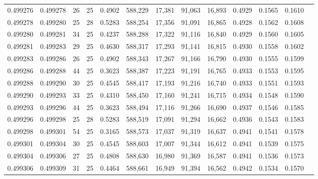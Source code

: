 \begin{tabular}{rrrrrrrrrrrrr}
0.499276 & 0.499278 &    26 &  25 &                                     0.4902 & 588,229 &  17,381 &  91,063 &  16,893 & 0.4929 & 0.1565 & 0.1610 \\
0.499278 & 0.499280 &    25 &  28 &                                     0.5283 & 588,254 &  17,356 &  91,091 &  16,865 & 0.4928 & 0.1562 & 0.1608 \\
0.499280 & 0.499281 &    34 &  25 &                                     0.4237 & 588,288 &  17,322 &  91,116 &  16,840 & 0.4929 & 0.1560 & 0.1605 \\
0.499281 & 0.499283 &    29 &  25 &                                     0.4630 & 588,317 &  17,293 &  91,141 &  16,815 & 0.4930 & 0.1558 & 0.1602 \\
0.499283 & 0.499286 &    26 &  25 &                                     0.4902 & 588,343 &  17,267 &  91,166 &  16,790 & 0.4930 & 0.1555 & 0.1599 \\
0.499286 & 0.499288 &    44 &  25 &                                     0.3623 & 588,387 &  17,223 &  91,191 &  16,765 & 0.4933 & 0.1553 & 0.1595 \\
0.499288 & 0.499290 &    30 &  25 &                                     0.4545 & 588,417 &  17,193 &  91,216 &  16,740 & 0.4933 & 0.1551 & 0.1593 \\
0.499290 & 0.499293 &    33 &  25 &                                     0.4310 & 588,450 &  17,160 &  91,241 &  16,715 & 0.4934 & 0.1548 & 0.1590 \\
0.499293 & 0.499296 &    44 &  25 &                                     0.3623 & 588,494 &  17,116 &  91,266 &  16,690 & 0.4937 & 0.1546 & 0.1585 \\
0.499296 & 0.499298 &    25 &  28 &                                     0.5283 & 588,519 &  17,091 &  91,294 &  16,662 & 0.4936 & 0.1543 & 0.1583 \\
0.499298 & 0.499301 &    54 &  25 &                                     0.3165 & 588,573 &  17,037 &  91,319 &  16,637 & 0.4941 & 0.1541 & 0.1578 \\
0.499301 & 0.499304 &    30 &  25 &                                     0.4545 & 588,603 &  17,007 &  91,344 &  16,612 & 0.4941 & 0.1539 & 0.1575 \\
0.499304 & 0.499306 &    27 &  25 &                                     0.4808 & 588,630 &  16,980 &  91,369 &  16,587 & 0.4941 & 0.1536 & 0.1573 \\
0.499306 & 0.499309 &    31 &  25 &                                     0.4464 & 588,661 &  16,949 &  91,394 &  16,562 & 0.4942 & 0.1534 & 0.1570 \\

\end{tabular}
